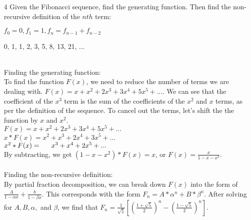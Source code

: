 \begin{problem}
4 Given the Fibonacci sequence, find the generating function. Then find the non-recursive definition of the $nth$ term: 
\begin{center} $f_{0}=0, f_{1}=1, f_{n}=f_{n-1}+f_{n-2}$ \end{center}
\begin{center} 0, 1, 1, 2, 3, 5, 8, 13, 21, ... \end{center}
\end{problem}

\begin{solution} \\
Finding the generating function: \\To find the function $F(x)$, we need to reduce the number of terms we are dealing with. $F(x) = x + x^2 + 2x^3 + 3x^4 + 5x^5 + ...$. We can see that the coefficient of the $x^3$ term is the sum of the coefficients of the $x^2$ and $x$ terms, as per the definition of the sequence. To cancel out the terms, let's shift the the function by ${x}$ and ${x^2}$.\\
$F(x) = x + x^2 + 2x^3 + 3x^4 + 5x^5 + ...$\\
$x * F(x) = x^2 + x^3 + 2x^4 + 3x^5 + ...$ \\
$x^2*F(x) = \indent   x^3 + x^4 + 2x^5 + ...$ \\
By subtracting, we get $(1-x-x^2)*F(x) = x$, or $F(x) = \frac{x}{1-x-x^2}$. \\ \\ 
Finding the non-recursive definition: \\By partial fraction decomposition, we can break down $F(x)$ into the form of $\frac{A}{1-\alpha x}+\frac{b}{1-\beta x}$. This corresponds with the form $F_{n}=A*\alpha ^n + B*\beta ^n$. After solving for $A, B, \alpha,$ and $\beta$, we find that $F_{n}=\frac{1}{\sqrt{5}}[(\frac{1+\sqrt{5}}{2})^{n} - (\frac{1-\sqrt{5}}{2})^{n}]$.
\end{solution}


% 
